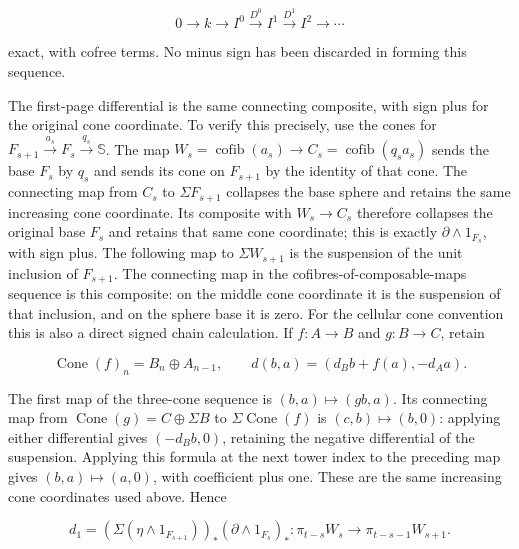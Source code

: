 \begin{equation}
0\longrightarrow k\longrightarrow I^0\xrightarrow{D^0}I^1
 \xrightarrow{D^1}I^2\longrightarrow\cdots
 \label{courseIII:the-original-odd-prime-cooperations-and-degree-six-adams-calculation:eq:6.6}
\end{equation}

exact, with cofree terms. No minus sign has been discarded in forming this sequence.

The first-page differential is the same connecting composite, with sign plus for the original cone coordinate. To verify this precisely, use the cones for
\(F_{s+1}\xrightarrow{a_s}F_s\xrightarrow{q_s}\mathbb S\).
The map \(W_s=\operatorname{cofib}(a_s)\to C_s=\operatorname{cofib}(q_sa_s)\) sends the base \(F_s\) by \(q_s\) and sends its cone on \(F_{s+1}\) by the identity of that cone. The connecting map from \(C_s\) to \(\Sigma F_{s+1}\) collapses the base sphere and retains the same increasing cone coordinate. Its composite with \(W_s\to C_s\) therefore collapses the original base \(F_s\) and retains that same cone coordinate; this is exactly \(\partial\wedge1_{F_s}\), with sign plus. The following map to \(\Sigma W_{s+1}\) is the suspension of the unit inclusion of \(F_{s+1}\). The connecting map in the cofibres-of-composable-maps sequence is this composite: on the middle cone coordinate it is the suspension of that inclusion, and on the sphere base it is zero. For the cellular cone convention this is also a direct signed chain calculation. If \(f:A\to B\) and \(g:B\to C\), retain

\[
 \operatorname{Cone}(f)_n=B_n\oplus A_{n-1},\qquad
 d(b,a)=(d_Bb+f(a),-d_Aa).
\]

The first map of the three-cone sequence is \((b,a)\mapsto(gb,a)\). Its connecting map from \(\operatorname{Cone}(g)=C\oplus\Sigma B\) to \(\Sigma\operatorname{Cone}(f)\) is \((c,b)\mapsto(b,0)\): applying either differential gives \((-d_Bb,0)\), retaining the negative differential of the suspension. Applying this formula at the next tower index to the preceding map gives \((b,a)\mapsto(a,0)\), with coefficient plus one. These are the same increasing cone coordinates used above. Hence

\begin{equation}
d_1=(\Sigma(\eta\wedge1_{F_{s+1}}))_*
        (\partial\wedge1_{F_s})_*:
 \pi_{t-s}W_s\longrightarrow\pi_{t-s-1}W_{s+1}.
 \label{courseIII:the-original-odd-prime-cooperations-and-degree-six-adams-calculation:eq:6.7}
\end{equation}

